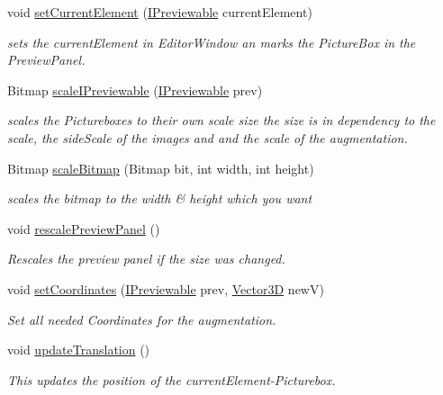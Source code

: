 \begin{DoxyCompactItemize}
void \hyperlink{class_preview_controller_ae5cb0828e43829a516a998407d6f8a1a}{set\-Current\-Element} (\hyperlink{interface_a_rdev_kit_1_1_model_1_1_project_1_1_i_previewable}{I\-Previewable} current\-Element)
\begin{DoxyCompactList}\small\item\em sets the current\-Element in Editor\-Window an marks the Picture\-Box in the Preview\-Panel. \end{DoxyCompactList}\item 
Bitmap \hyperlink{class_preview_controller_a3e156e717573c15c3ef9a3baada91085}{scale\-I\-Previewable} (\hyperlink{interface_a_rdev_kit_1_1_model_1_1_project_1_1_i_previewable}{I\-Previewable} prev)
\begin{DoxyCompactList}\small\item\em scales the Pictureboxes to their own scale size the size is in dependency to the scale, the side\-Scale of the images and and the scale of the augmentation. \end{DoxyCompactList}\item 
Bitmap \hyperlink{class_preview_controller_a0013a78d729579e06c50551e87350091}{scale\-Bitmap} (Bitmap bit, int width, int height)
\begin{DoxyCompactList}\small\item\em scales the bitmap to the width \& height which you want \end{DoxyCompactList}\item 
void \hyperlink{class_preview_controller_a03acb2816496e20b416346aeff126b04}{rescale\-Preview\-Panel} ()
\begin{DoxyCompactList}\small\item\em Rescales the preview panel if the size was changed. \end{DoxyCompactList}\item 
void \hyperlink{class_preview_controller_a3b909b7f753ee543cbf42dfdb9a0316f}{set\-Coordinates} (\hyperlink{interface_a_rdev_kit_1_1_model_1_1_project_1_1_i_previewable}{I\-Previewable} prev, \hyperlink{class_a_rdev_kit_1_1_model_1_1_project_1_1_vector3_d}{Vector3\-D} new\-V)
\begin{DoxyCompactList}\small\item\em Set all needed Coordinates for the augmentation. \end{DoxyCompactList}\item 
void \hyperlink{class_preview_controller_af14f36a06e16003c0cc11188024521c7}{update\-Translation} ()
\begin{DoxyCompactList}\small\item\em This updates the position of the current\-Element-\/\-Picturebox. \end{DoxyCompactList}\item 

\end{DoxyCompactItemize}

